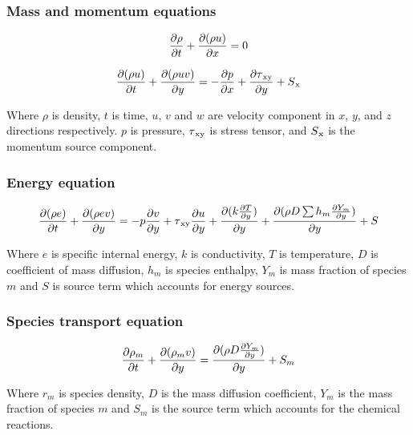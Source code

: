 \documentclass[conference]{IEEEtran}
\begin{document}
\subsubsection{Mass and momentum equations}

    \begin{gather*}
        \pdv{\rho}{t} + \pdv{(\rho u)}{ x} = 0
    \end{gather*}

    \begin{gather*}
        \pdv{(\rho u)}{t} + \pdv{(\rho uv)}{y} = - \pdv{p}{x} + \pdv{\tau\textsubscript{xy}}{y} + S\textsubscript{x}
    \end{gather*}

Where $\rho$ is density, $t$ is time, $u$, $v$ and $w$ are velocity component in $x$, $y$, and $z$ directions respectively. 
$p$ is pressure, $\tau\textsubscript{xy}$ is stress tensor, and $S\textsubscript{x}$ is the momentum source component.\\

\subsubsection{Energy equation}

    \begin{gather*}
        \pdv{(\rho e)}{t} + \pdv{(\rho ev)}{y} = -p \pdv{v}{y} + \tau \textsubscript{xy} \pdv{u}{y} + \pdv{(k \pdv{T}{y})}{y} + \pdv{(\rho D \sum h_m \pdv{Y_m}{y})}{y} + S
    \end{gather*}

Where $e$ is specific internal energy, $k$ is conductivity, $T$ is temperature, $D$ is coefficient of mass diffusion, $h_m$ is species enthalpy, $Y_m$ is mass fraction of species $m$ and $S$ is source term which accounts for energy sources.\\

\subsubsection{Species transport equation}

    \begin{gather*}
        \pdv{\rho_m}{t} + \pdv{(\rho_m v)}{y} = \pdv{(\rho D \pdv{Y_m}{y})}{y} +  S_m
    \end{gather*}

Where $r_m$ is species density, $D$ is the mass diffusion coefficient, $Y_m$ is the mass fraction of species $m$ and $S_m$ is the source term which accounts for the chemical reactions.\\
\end{document}
